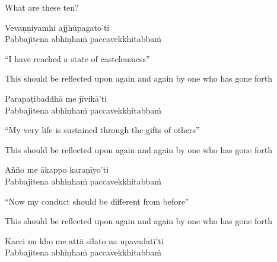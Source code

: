 \begin{english}
  What are these ten?
\end{english}

\begin{pali-hang}
  Vevaṇṇiyamhi ajjhūpagato'ti\\
  Pabbajitena abhiṇhaṁ paccavekkhitabbaṁ
\end{pali-hang}

\begin{english-verses}
  ``I have reached a state of castelessness''\makeatletter\hyperlink{endnote100-appendix}\makeatother
  \begin{english-hangtogether-verses}
    This should be reflected upon again and again by one who has gone forth
  \end{english-hangtogether-verses}
\end{english-verses}

Parapaṭibaddhā me jīvikā'ti\\
Pabbajitena abhiṇhaṁ paccavekkhitabbaṁ

\begin{english-verses}
  ``My very life is sustained through the gifts of others''
  \begin{english-hangtogether-verses}
    This should be reflected upon again and again by one who has gone forth
  \end{english-hangtogether-verses}
\end{english-verses}

Añño me ākappo karaṇīyo'ti\\
Pabbajitena abhiṇhaṁ paccavekkhitabbaṁ

\begin{english-verses}
  ``Now my conduct should be different from before''\makeatletter\hyperlink{endnote101-appendix}\makeatother
  \begin{english-hangtogether-verses}
    This should be reflected upon again and again by one who has gone forth
  \end{english-hangtogether-verses}
\end{english-verses}

Kacci nu kho me attā sīlato na upavadatī'ti\\
Pabbajitena abhiṇhaṁ paccavekkhitabbaṁ

